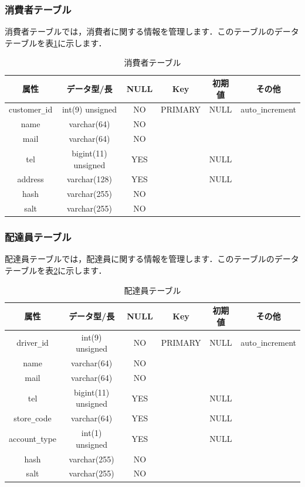 \documentclass[a4j,titlepage]{jarticle}
\begin{document}
\subsubsection{消費者テーブル}
消費者テーブルでは，消費者に関する情報を管理します．このテーブルのデータテーブルを表\ref{customer}に示します．
\begin{table}[htb]
  \caption{消費者テーブル}
  \label{customer}
  \begin{center}
    \begin{tabular}{|c|c|c|c|c|c|} \hline
      属性 & データ型/長 & NULL & Key & 初期値 & その他 \\ \hline \hline
      customer\verb|_|id & int(9) unsigned & NO & PRIMARY & NULL & auto\verb|_|increment\\ \hline
      name & varchar(64) & NO &   &  & \\ \hline
      mail & varchar(64) & NO &   &  & \\ \hline
      tel & bigint(11) unsigned & YES &   & NULL & \\ \hline
      address & varchar(128) & YES &   & NULL & \\ \hline
      hash & varchar(255) & NO &   &  & \\ \hline
      salt & varchar(255) & NO &   &  & \\ \hline
    \end{tabular}
  \end{center}
\end{table}
\clearpage

\subsubsection{配達員テーブル}
配達員テーブルでは，配達員に関する情報を管理します．このテーブルのデータテーブルを表\ref{driver}に示します．
\begin{table}[htb]
  \caption{配達員テーブル}
  \label{driver}
  \begin{center}
    \begin{tabular}{|c|c|c|c|c|c|} \hline
      属性 & データ型/長 & NULL & Key & 初期値 & その他 \\ \hline \hline
      driver\verb|_|id & int(9) unsigned & NO & PRIMARY & NULL & auto\verb|_|increment\\ \hline
      name & varchar(64) & NO &   &  & \\ \hline
      mail & varchar(64) & NO &  &  & \\ \hline
      tel & bigint(11) unsigned & YES &  & NULL & \\ \hline
      store\verb|_|code & varchar(64) & YES &   & NULL & \\ \hline
      account\verb|_|type & int(1) unsigned & YES &   & NULL & \\ \hline
      hash & varchar(255) & NO &   &  & \\ \hline
      salt & varchar(255) & NO &   &  & \\ \hline
    \end{tabular}
  \end{center}
\end{table}
\end{document}
